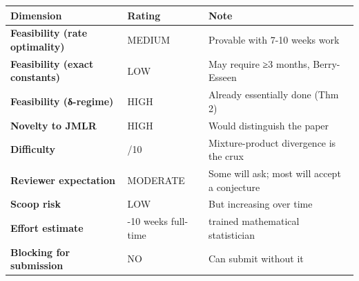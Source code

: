 \documentclass[
  12pt,
]{ctexart}
\begin{document}
\begin{longtable}[]{@{}
  >{\raggedright\arraybackslash}p{}
  >{\raggedright\arraybackslash}p{}
  >{\raggedright\arraybackslash}p{}@{}}
\toprule\noalign{}
\begin{minipage}[b]{\linewidth}\raggedright
Dimension
\end{minipage} & \begin{minipage}[b]{\linewidth}\raggedright
Rating
\end{minipage} & \begin{minipage}[b]{\linewidth}\raggedright
Note
\end{minipage} \\
\midrule\noalign{}
\endhead
\bottomrule\noalign{}
\endlastfoot
\textbf{Feasibility (rate optimality)} & MEDIUM & Provable with 7-10
weeks work \\
\textbf{Feasibility (exact constants)} & LOW & May require ≥3 months,
Berry-Esseen \\
\textbf{Feasibility (δ-regime)} & HIGH & Already essentially done (Thm
2) \\
\textbf{Novelty to JMLR} & HIGH & Would distinguish the paper \\
\textbf{Difficulty} & 7/10 & Mixture-product divergence is the crux \\
\textbf{Reviewer expectation} & MODERATE & Some will ask; most will
accept a conjecture \\
\textbf{Scoop risk} & LOW & But increasing over time \\
\textbf{Effort estimate} & 7-10 weeks full-time & 1 trained mathematical
statistician \\
\textbf{Blocking for submission} & NO & Can submit without it \\
\end{longtable}
\end{document}
